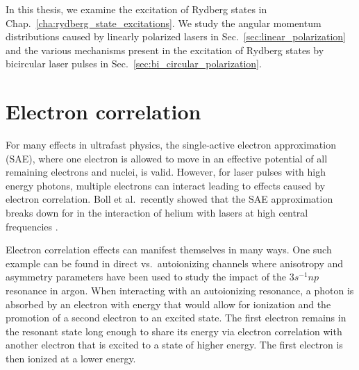 In this thesis, we examine the excitation of Rydberg states in Chap.~\ref{cha:rydberg_state_excitations}. We study the angular momentum distributions caused by linearly polarized lasers in Sec.~\ref{sec:linear_polarization} and the various mechanisms present in the excitation of Rydberg states by bicircular laser pulses in Sec.~\ref{sec:bi_circular_polarization}.

\section{Electron correlation} %
\label{sec:electron_correlation}

For many effects in ultrafast physics, the single-active electron approximation (SAE), where one electron is allowed to move in an effective potential of all remaining electrons and nuclei, is valid. However, for laser pulses with high energy photons, multiple electrons can interact leading to effects caused by electron correlation. Boll et al.\ recently showed that the SAE approximation breaks down for in the interaction of helium with lasers at high central frequencies \cite{boll2019}.

Electron correlation effects can manifest themselves in many ways. One such example can be found in direct vs.\ autoionizing channels \cite{cirelli2018} where anisotropy and asymmetry parameters have been used to study the impact of the $3s^{-1}np$ resonance in argon. When interacting with an autoionizing resonance, a photon is absorbed by an electron with energy that would allow for ionization and the promotion of a second electron to an excited state. The first electron remains in the resonant state long enough to share its energy via electron correlation with another electron that is excited to a state of higher energy. The first electron is then ionized at a lower energy. 

